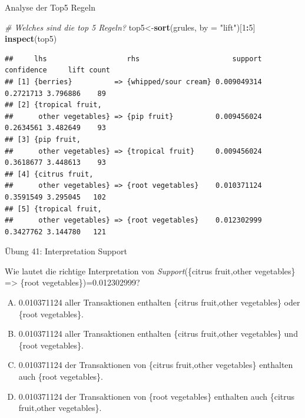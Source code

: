 \documentclass[12pt,ngerman,a4paper,ignorenonframetext,]{beamer}
\newenvironment{Shaded}{\begin{snugshade}}{\end{snugshade}}
\newcommand{\CommentTok}[1]{\textcolor[rgb]{0.56,0.35,0.01}{\textit{#1}}}
\newcommand{\DataTypeTok}[1]{\textcolor[rgb]{0.13,0.29,0.53}{#1}}
\newcommand{\DecValTok}[1]{\textcolor[rgb]{0.00,0.00,0.81}{#1}}
\newcommand{\KeywordTok}[1]{\textcolor[rgb]{0.13,0.29,0.53}{\textbf{#1}}}
\newcommand{\NormalTok}[1]{#1}
\newcommand{\OperatorTok}[1]{\textcolor[rgb]{0.81,0.36,0.00}{\textbf{#1}}}
\newcommand{\StringTok}[1]{\textcolor[rgb]{0.31,0.60,0.02}{#1}}
\providecommand{\tightlist}{%
  \setlength{\itemsep}{0pt}\setlength{\parskip}{0pt}}
\begin{document}
\begin{frame}{Analyse der Top5 Regeln}
\protect\hypertarget{analyse-der-top5-regeln}{}

\begin{Shaded}
\begin{Highlighting}[]
\CommentTok{# Welches sind die top 5 Regeln?  }
\NormalTok{top5<-}\KeywordTok{sort}\NormalTok{(grules, }\DataTypeTok{by =} \StringTok{"lift"}\NormalTok{)[}\DecValTok{1}\OperatorTok{:}\DecValTok{5}\NormalTok{]}
\KeywordTok{inspect}\NormalTok{(top5)}
\end{Highlighting}
\end{Shaded}

\begin{verbatim}
##     lhs                   rhs                      support confidence     lift count
## [1] {berries}          => {whipped/sour cream} 0.009049314  0.2721713 3.796886    89
## [2] {tropical fruit,                                                                
##      other vegetables} => {pip fruit}          0.009456024  0.2634561 3.482649    93
## [3] {pip fruit,                                                                     
##      other vegetables} => {tropical fruit}     0.009456024  0.3618677 3.448613    93
## [4] {citrus fruit,                                                                  
##      other vegetables} => {root vegetables}    0.010371124  0.3591549 3.295045   102
## [5] {tropical fruit,                                                                
##      other vegetables} => {root vegetables}    0.012302999  0.3427762 3.144780   121
\end{verbatim}

\end{frame}

\begin{frame}{Übung 41: Interpretation Support}
\protect\hypertarget{ubung-41-interpretation-support}{}

Wie lautet die richtige Interpretation von \emph{Support}(\{citrus
fruit,other vegetables\} =\textgreater{} \{root
vegetables\})=0.012302999?

\begin{enumerate}
[A.]
\tightlist
\item
  0.010371124 aller Transaktionen enthalten \{citrus fruit,other
  vegetables\} oder \{root vegetables\}.
\item
  0.010371124 aller Transaktionen enthalten \{citrus fruit,other
  vegetables\} und \{root vegetables\}.
\item
  0.010371124 der Transaktionen von \{citrus fruit,other vegetables\}
  enthalten auch \{root vegetables\}.
\item
  0.010371124 der Transaktionen von \{root vegetables\} enthalten auch
  \{citrus fruit,other vegetables\}.
\end{enumerate}


\end{frame}
\end{document}
